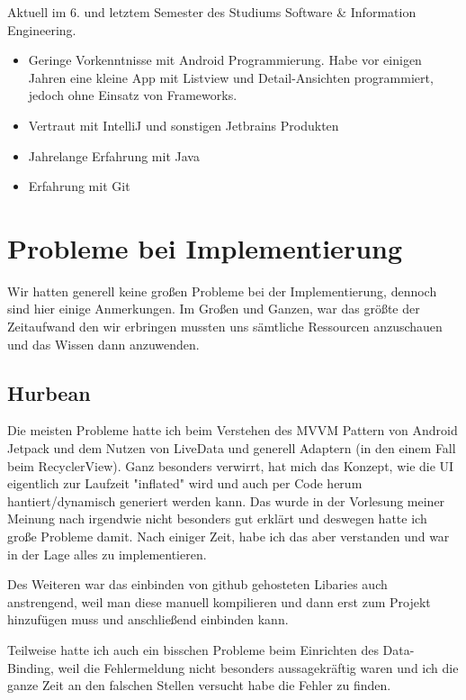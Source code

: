 \documentclass{mrtrash}
\begin{document}
Aktuell im 6. und letztem Semester des Studiums Software \& Information Engineering.

\begin{itemize}
    \item Geringe Vorkenntnisse mit Android Programmierung. Habe vor einigen Jahren eine kleine App mit Listview und Detail-Ansichten programmiert, jedoch ohne Einsatz von Frameworks.
    \item Vertraut mit IntelliJ und sonstigen Jetbrains Produkten
    \item Jahrelange Erfahrung mit Java
    \item Erfahrung mit Git
\end{itemize}

\begin{minipage}[t]{\textwidth}
    \centering
\end{minipage}

\section{Probleme bei Implementierung}

Wir hatten generell keine großen Probleme bei der Implementierung, dennoch sind hier einige Anmerkungen. Im Großen und Ganzen, war das größte der Zeitaufwand den wir erbringen mussten uns sämtliche Ressourcen anzuschauen und das Wissen dann anzuwenden.

\subsection{Hurbean}

Die meisten Probleme hatte ich beim Verstehen des MVVM Pattern von Android Jetpack und dem Nutzen von LiveData und generell Adaptern (in den einem Fall beim RecyclerView). Ganz besonders verwirrt, hat mich das Konzept, wie die UI eigentlich zur Laufzeit "inflated" wird und auch per Code herum hantiert/dynamisch generiert werden kann. Das wurde in der Vorlesung meiner Meinung nach irgendwie nicht besonders gut erklärt und deswegen hatte ich große Probleme damit. Nach einiger Zeit, habe ich das aber verstanden und war in der Lage alles zu implementieren.

Des Weiteren war das einbinden von github gehosteten Libaries auch anstrengend, weil man diese manuell kompilieren und dann erst zum Projekt hinzufügen muss und anschließend einbinden kann.

Teilweise hatte ich auch ein bisschen Probleme beim Einrichten des Data-Binding, weil die Fehlermeldung nicht besonders aussagekräftig waren und ich die ganze Zeit an den falschen Stellen versucht habe die Fehler zu finden.
\end{document}
